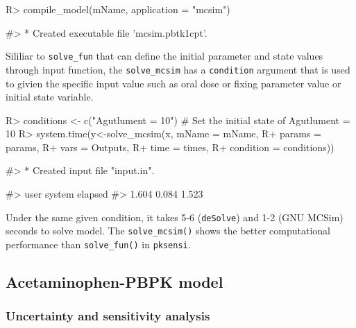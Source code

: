 \documentclass[article]{jss}
\begin{document}
\begin{CodeChunk}

\begin{CodeInput}
R> compile_model(mName, application = "mcsim")
\end{CodeInput}

\begin{CodeOutput}
#> * Created executable file 'mcsim.pbtk1cpt'.
\end{CodeOutput}
\end{CodeChunk}

Sililiar to \texttt{solve\_fun} that can define the initial parameter
and state values through input function, the \texttt{solve\_mcsim} has a
\texttt{condition} argument that is used to givien the specific input
value such as oral dose or fixing parameter value or initial state
variable.

\begin{CodeChunk}

\begin{CodeInput}
R> conditions <- c("Agutlument = 10") # Set the initial state of Agutlument = 10 
R> system.time(y<-solve_mcsim(x, mName = mName, 
R+                            params = params,
R+                            vars = Outputs,
R+                            time = times,
R+                            condition = conditions))
\end{CodeInput}

\begin{CodeOutput}
#> * Created input file "input.in".
\end{CodeOutput}

\begin{CodeOutput}
#>    user  system elapsed 
#>   1.604   0.084   1.523
\end{CodeOutput}
\end{CodeChunk}

Under the same given condition, it takes 5-6 (\texttt{deSolve}) and 1-2
(GNU MCSim) seconds to solve model. The \texttt{solve\_mcsim()} shows
the better computational performance than \texttt{solve\_fun()} in
\texttt{pksensi}.

\hypertarget{acetaminophen-pbpk-model}{%
\subsection{Acetaminophen-PBPK model}\label{acetaminophen-pbpk-model}}

\hypertarget{uncertainty-and-sensitivity-analysis}{%
\subsubsection{Uncertainty and sensitivity
analysis}\label{uncertainty-and-sensitivity-analysis}}
\end{document}
